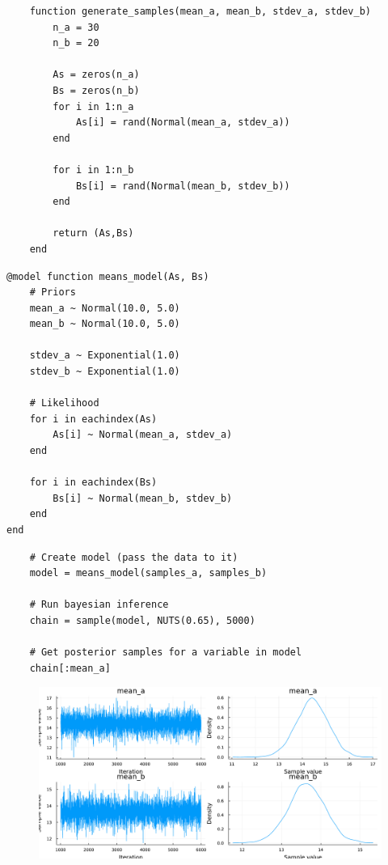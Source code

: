 \documentclass[aspectratio=169,xcolor=svgnames]{beamer}
\begin{document}
\begin{frame}[fragile]

    \begin{verbatim}
    function generate_samples(mean_a, mean_b, stdev_a, stdev_b)
        n_a = 30
        n_b = 20

        As = zeros(n_a)
        Bs = zeros(n_b)
        for i in 1:n_a
            As[i] = rand(Normal(mean_a, stdev_a))
        end

        for i in 1:n_b
            Bs[i] = rand(Normal(mean_b, stdev_b))
        end

        return (As,Bs)
    end
    \end{verbatim}
\end{frame}

\begin{frame}[fragile]
  \begin{verbatim}
@model function means_model(As, Bs)
    # Priors
    mean_a ~ Normal(10.0, 5.0)
    mean_b ~ Normal(10.0, 5.0)

    stdev_a ~ Exponential(1.0)
    stdev_b ~ Exponential(1.0)

    # Likelihood
    for i in eachindex(As)
        As[i] ~ Normal(mean_a, stdev_a)
    end

    for i in eachindex(Bs)
        Bs[i] ~ Normal(mean_b, stdev_b)
    end
end
  \end{verbatim}
\end{frame}

\begin{frame}[fragile]
  \begin{verbatim}
    # Create model (pass the data to it)
    model = means_model(samples_a, samples_b)

    # Run bayesian inference
    chain = sample(model, NUTS(0.65), 5000)

    # Get posterior samples for a variable in model
    chain[:mean_a]
  \end{verbatim}
\end{frame}

\begin{frame}
  \begin{figure}[ht]
    \centering
    \includegraphics[height=0.7\textheight]{figures/chain_mean.pdf}
  \end{figure}
\end{frame}
\end{document}
